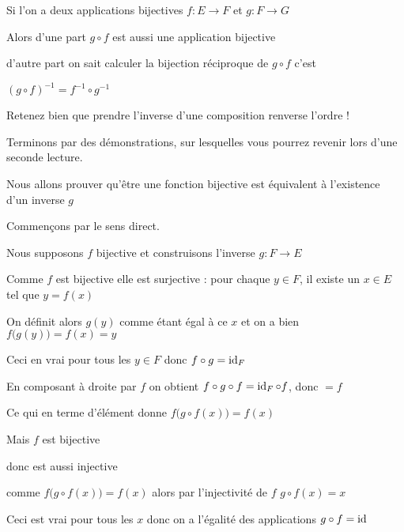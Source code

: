 Si l'on a deux applications bijectives $f : E \to F$ et $g : F \to G$ 


Alors d'une part $g \circ f$ est aussi une application bijective

\change

d'autre part on sait calculer la bijection réciproque de $g\circ f$ c'est

$(g\circ f)^{-1} = f^{-1} \circ g^{-1}$

Retenez bien que prendre l'inverse d'une composition renverse l'ordre !


\diapo

Terminons par des démonstrations, sur lesquelles vous pourrez revenir lors d'une seconde lecture.


Nous allons prouver qu'être une fonction bijective est équivalent à l'existence 
d'un inverse $g$

\change

Commençons par le sens direct.

\change

Nous supposons $f$ bijective et construisons l'inverse $g : F \to E$ 

\change

Comme $f$ est bijective elle est surjective : pour chaque $y \in F$, il existe un $x \in E$ tel que $y=f(x)$

\change

On définit alors $g(y)$ comme étant égal à ce $x$ et on a bien $f\big( g(y) \big) = f(x) =y$

\change

Ceci en vrai pour tous les $y\in F$ donc $f \circ g = \mathop{\text{id}}\nolimits_F$

\change

En composant à droite par $f$ on obtient 
 $f \circ g \circ f = \mathop{\text{id}}\nolimits_F \circ f$, donc $=f$

\change

Ce qui en terme d'élément donne 
$f\big( g\circ f(x) \big) = f(x)$ 

\change

Mais $f$ est bijective 

donc est aussi injective 

comme $f\big( g\circ f(x) \big) = f(x)$ alors 
par l'injectivité de $f$ 
$g\circ f(x)=x$

\change

Ceci est vrai pour tous les  $x$   donc 
on a l'égalité des applications $g\circ f = \mathop{\text{id}}\nolimits$


